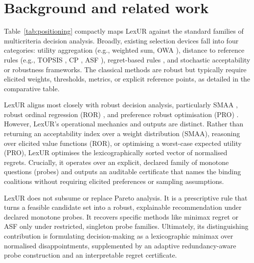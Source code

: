 \section{Background and related work}
\label{sec:related}

Table~\ref{tab:positioning} compactly maps LexUR against the standard families of multicriteria decision analysis. Broadly, existing selection devices fall into four categories: utility aggregation (e.g., weighted sum, OWA \citep{yager1988,torra1997}), distance to reference rules (e.g., TOPSIS \citep{hwang1981}, CP \citep{zeleny1982}, ASF \citep{wierzbicki1980}), regret-based rules \citep{savage1951,kouvelis1997}, and stochastic acceptability or robustness frameworks. The classical methods are robust but typically require elicited weights, thresholds, metrics, or explicit reference points, as detailed in the comparative table.

LexUR aligns most closely with robust decision analysis, particularly SMAA \citep{lahdelma1998,tervonen2007}, robust ordinal regression (ROR) \citep{greco2008,figueira2009}, and preference robust optimisation (PRO) \citep{armbruster2015,hu2015}. However, LexUR's operational mechanics and outputs are distinct. Rather than returning an acceptability index over a weight distribution (SMAA), reasoning over elicited value functions (ROR), or optimising a worst-case expected utility (PRO), LexUR optimises the lexicographically sorted vector of normalised regrets. Crucially, it operates over an explicit, declared family of monotone questions (probes) and outputs an auditable certificate that names the binding coalitions without requiring elicited preferences or sampling assumptions. 

LexUR does not subsume or replace Pareto analysis. It is a prescriptive rule that turns a feasible candidate set into a robust, explainable recommendation under declared monotone probes. It recovers specific methods like minimax regret or ASF only under restricted, singleton probe families. Ultimately, its distinguishing contribution is formulating decision-making as a lexicographic minimax over normalised disappointments, supplemented by an adaptive redundancy-aware probe construction and an interpretable regret certificate.

